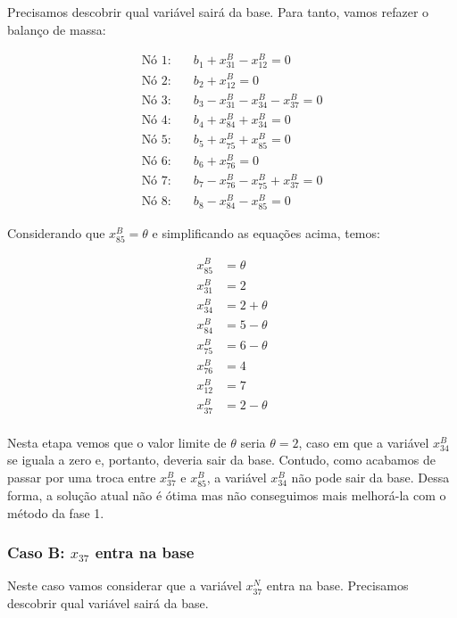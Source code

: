 \documentclass{article}
\begin{document}
Precisamos descobrir qual variável sairá da base.
Para tanto, vamos refazer o balanço de massa:

\begin{align}
    \text{Nó 1:} & \quad b_{1} + x^{B}_{31} - x^{B}_{12} = 0 \\
    \text{Nó 2:} & \quad b_{2} + x^{B}_{12} = 0 \\
    \text{Nó 3:} & \quad b_{3} - x^{B}_{31} - x^{B}_{34} - x^{B}_{37} = 0 \\
    \text{Nó 4:} & \quad b_{4} + x^{B}_{84} + x^{B}_{34} = 0 \\
    \text{Nó 5:} & \quad b_{5} + x^{B}_{75} + x^{B}_{85} = 0 \\
    \text{Nó 6:} & \quad b_{6} + x^{B}_{76} = 0 \\
    \text{Nó 7:} & \quad b_{7} - x^{B}_{76} - x^{B}_{75} + x^{B}_{37} = 0 \\
    \text{Nó 8:} & \quad b_{8} - x^{B}_{84} - x^{B}_{85} = 0
\end{align}

Considerando que $x^{B}_{85} = \theta$ e simplificando as equações acima, temos:

\begin{align*}
    x^{B}_{85} &= \theta \\
    x^{B}_{31} &= 2 \\
    x^{B}_{34} &= 2 + \theta \\
    x^{B}_{84} &= 5 - \theta \\
    x^{B}_{75} &= 6 - \theta \\
    x^{B}_{76} &= 4 \\
    x^{B}_{12} &= 7 \\
    x^{B}_{37} &= 2 - \theta \\
\end{align*}

Nesta etapa vemos que o valor limite de $\theta$ seria $\theta=2$, caso em que a variável $x^{B}_{34}$ se iguala a zero e, portanto, deveria sair da base.
Contudo, como acabamos de passar por uma troca entre $x^{B}_{37}$ e $x^{B}_{85}$, a variável $x^{B}_{34}$ não pode sair da base.
Dessa forma, a solução atual não é ótima mas não conseguimos mais melhorá-la com o método da fase 1.

\subsubsection{Caso B: $x_{37}$ entra na base}

Neste caso vamos considerar que a variável $x^{N}_{37}$ entra na base.
Precisamos descobrir qual variável sairá da base.
\end{document}
